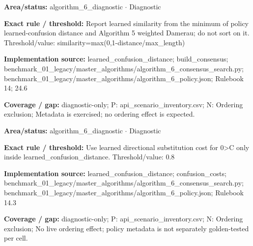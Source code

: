 \begin{tcolorbox}[enhanced,breakable,colback=white,colframe=Muted!45,boxrule=0.45pt,arc=1.5pt,left=6pt,right=6pt,top=5pt,bottom=5pt,title={\texttt{A6-LEARNED-SIMILARITY-10}},title after break={\texttt{A6-LEARNED-SIMILARITY-10}\ (continued)},fonttitle=\headingfont\bfseries\color{Navy},coltitle=Navy]
\textbf{Area/status:} algorithm\_\allowbreak{}6\_\allowbreak{}diagnostic $\boldsymbol{\cdot}$ Diagnostic\par
\smallskip
\textbf{Exact rule / threshold:} Report learned similarity from the minimum of policy learned-confusion distance and Algorithm 5 weighted Damerau; do not sort on it. Threshold/\allowbreak{}value: similarity=max(0,1-distance/\allowbreak{}max\_\allowbreak{}length)\par
\smallskip
\textbf{Implementation source:} learned\_\allowbreak{}confusion\_\allowbreak{}distance; build\_\allowbreak{}consensus; benchmark\_\allowbreak{}01\_\allowbreak{}legacy/\allowbreak{}master\_\allowbreak{}algorithms/\allowbreak{}algorithm\_\allowbreak{}6\_\allowbreak{}consensus\_\allowbreak{}search.py; benchmark\_\allowbreak{}01\_\allowbreak{}legacy/\allowbreak{}master\_\allowbreak{}algorithms/\allowbreak{}algorithm\_\allowbreak{}6\_\allowbreak{}policy.json; Rulebook 14; 24.6\par
\smallskip
\textbf{Coverage / gap:} diagnostic-only; P: api\_\allowbreak{}scenario\_\allowbreak{}inventory.csv; N: Ordering exclusion; Metadata is exercised; no ordering effect is expected.
\end{tcolorbox}
\begin{tcolorbox}[enhanced,breakable,colback=white,colframe=Muted!45,boxrule=0.45pt,arc=1.5pt,left=6pt,right=6pt,top=5pt,bottom=5pt,title={\texttt{A6-LEARNED-SUBSTITUTION-0-C}},title after break={\texttt{A6-LEARNED-SUBSTITUTION-0-C}\ (continued)},fonttitle=\headingfont\bfseries\color{Navy},coltitle=Navy]
\textbf{Area/status:} algorithm\_\allowbreak{}6\_\allowbreak{}diagnostic $\boldsymbol{\cdot}$ Diagnostic\par
\smallskip
\textbf{Exact rule / threshold:} Use learned directional substitution cost for 0>C only inside learned\_\allowbreak{}confusion\_\allowbreak{}distance. Threshold/\allowbreak{}value: 0.8\par
\smallskip
\textbf{Implementation source:} learned\_\allowbreak{}confusion\_\allowbreak{}distance; confusion\_\allowbreak{}costs; benchmark\_\allowbreak{}01\_\allowbreak{}legacy/\allowbreak{}master\_\allowbreak{}algorithms/\allowbreak{}algorithm\_\allowbreak{}6\_\allowbreak{}consensus\_\allowbreak{}search.py; benchmark\_\allowbreak{}01\_\allowbreak{}legacy/\allowbreak{}master\_\allowbreak{}algorithms/\allowbreak{}algorithm\_\allowbreak{}6\_\allowbreak{}policy.json; Rulebook 14.3\par
\smallskip
\textbf{Coverage / gap:} diagnostic-only; P: api\_\allowbreak{}scenario\_\allowbreak{}inventory.csv; N: Ordering exclusion; No live ordering effect; policy metadata is not separately golden-tested per cell.
\end{tcolorbox}
